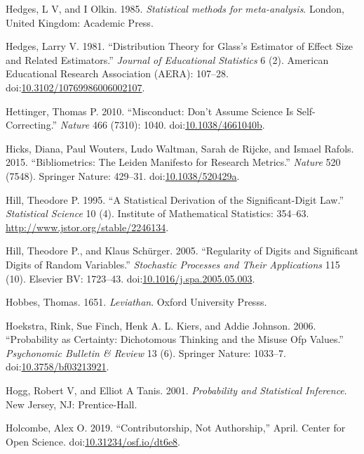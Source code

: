 \documentclass[a5paper]{book}
\begin{document}
\hypertarget{ref-Hedges1985-dy}{}
Hedges, L V, and I Olkin. 1985. \emph{Statistical methods for
meta-analysis}. London, United Kingdom: Academic Press.

\hypertarget{ref-doi:10.3102ux2f10769986006002107}{}
Hedges, Larry V. 1981. ``Distribution Theory for Glass's Estimator of
Effect Size and Related Estimators.'' \emph{Journal of Educational
Statistics} 6 (2). American Educational Research Association (AERA):
107--28.
doi:\href{https://doi.org/10.3102/10769986006002107}{10.3102/10769986006002107}.

\hypertarget{ref-doi:10.1038ux2f4661040b}{}
Hettinger, Thomas P. 2010. ``Misconduct: Don't Assume Science Is
Self-Correcting.'' \emph{Nature} 466 (7310): 1040.
doi:\href{https://doi.org/10.1038/4661040b}{10.1038/4661040b}.

\hypertarget{ref-doi:10.1038ux2f520429a}{}
Hicks, Diana, Paul Wouters, Ludo Waltman, Sarah de Rijcke, and Ismael
Rafols. 2015. ``Bibliometrics: The Leiden Manifesto for Research
Metrics.'' \emph{Nature} 520 (7548). Springer Nature: 429--31.
doi:\href{https://doi.org/10.1038/520429a}{10.1038/520429a}.

\hypertarget{ref-doi:10.2307ux2f2246134}{}
Hill, Theodore P. 1995. ``A Statistical Derivation of the
Significant-Digit Law.'' \emph{Statistical Science} 10 (4). Institute of
Mathematical Statistics: 354--63.
\url{http://www.jstor.org/stable/2246134}.

\hypertarget{ref-doi:10.1016ux2fj.spa.2005.05.003}{}
Hill, Theodore P., and Klaus Schürger. 2005. ``Regularity of Digits and
Significant Digits of Random Variables.'' \emph{Stochastic Processes and
Their Applications} 115 (10). Elsevier BV: 1723--43.
doi:\href{https://doi.org/10.1016/j.spa.2005.05.003}{10.1016/j.spa.2005.05.003}.

\hypertarget{ref-leviathan}{}
Hobbes, Thomas. 1651. \emph{Leviathan}. Oxford University Presss.

\hypertarget{ref-doi:10.3758ux2fbf03213921}{}
Hoekstra, Rink, Sue Finch, Henk A. L. Kiers, and Addie Johnson. 2006.
``Probability as Certainty: Dichotomous Thinking and the Misuse Ofp
Values.'' \emph{Psychonomic Bulletin \& Review} 13 (6). Springer Nature:
1033--7.
doi:\href{https://doi.org/10.3758/bf03213921}{10.3758/bf03213921}.

\hypertarget{ref-hogg-tanis}{}
Hogg, Robert V, and Elliot A Tanis. 2001. \emph{Probability and
Statistical Inference}. New Jersey, NJ: Prentice-Hall.

\hypertarget{ref-doi:10.31234ux2fosf.ioux2fdt6e8}{}
Holcombe, Alex O. 2019. ``Contributorship, Not Authorship,'' April.
Center for Open Science.
doi:\href{https://doi.org/10.31234/osf.io/dt6e8}{10.31234/osf.io/dt6e8}.
\end{document}

